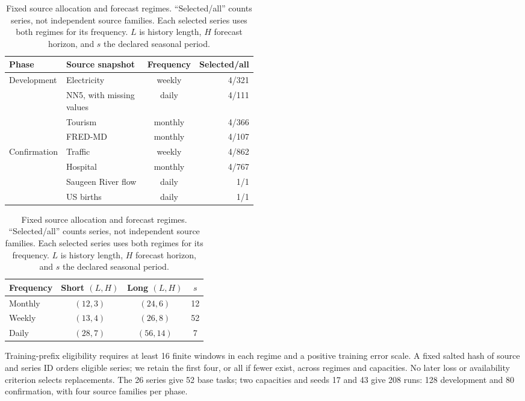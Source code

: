 \begin{table}[t]
\caption{Fixed source allocation and forecast regimes.  ``Selected/all'' counts
series, not independent source families.  Each selected series uses both regimes
for its frequency.  $L$ is history length, $H$ forecast horizon, and $s$ the
declared seasonal period.}
\label{tab:nf-sources}
\centering\small
\setlength{\tabcolsep}{4pt}
\begin{tabular}{@{}lp{0.48\linewidth}cr@{}}
\toprule
Phase & Source snapshot & Frequency & Selected/all \\
\midrule
Development & Electricity \citep{DatasetElectricityWeekly} & weekly & 4/321 \\
 & NN5, with missing values \citep{DatasetNN5Daily} & daily & 4/111 \\
 & Tourism \citep{DatasetTourismMonthly} & monthly & 4/366 \\
 & FRED-MD \citep{DatasetFREDMD} & monthly & 4/107 \\
\midrule
Confirmation & Traffic \citep{DatasetTrafficWeekly} & weekly & 4/862 \\
 & Hospital \citep{DatasetHospitalMonthly} & monthly & 4/767 \\
 & Saugeen River flow \citep{DatasetSaugeenDaily} & daily & 1/1 \\
 & US births \citep{DatasetUSBirthsDaily} & daily & 1/1 \\
\bottomrule
\end{tabular}
\par\medskip
\begin{tabular}{@{}lccc@{}}
\toprule
Frequency & Short $(L,H)$ & Long $(L,H)$ & $s$ \\
\midrule
Monthly & $(12,3)$ & $(24,6)$ & 12 \\
Weekly & $(13,4)$ & $(26,8)$ & 52 \\
Daily & $(28,7)$ & $(56,14)$ & 7 \\
\bottomrule
\end{tabular}
\end{table}

Training-prefix eligibility requires at least 16 finite windows in each regime
and a positive training error scale.  A fixed salted hash of source and series
ID orders eligible series; we retain the first four, or all if fewer exist,
across regimes and capacities.  No later loss or availability criterion selects
replacements.  The 26 series give 52 base tasks; two capacities and seeds 17
and 43 give 208 runs: 128 development and 80 confirmation, with four source
families per phase.

